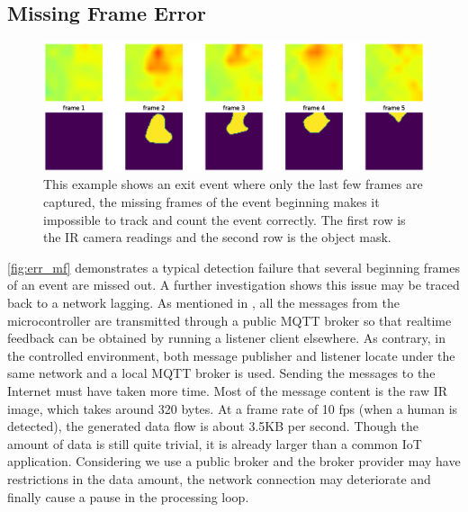 \subsection{Missing Frame Error}
\begin{figure}
  \centering
  \includegraphics[width=\textwidth]{figures/err_missingframe.eps}
  \caption{This example shows an exit event where only the last few frames are captured, the missing frames of the event beginning makes it impossible to track and count the event correctly. The first row is the IR camera readings and the second row is the object mask.}\label{fig:err_mf}
\end{figure}
\autoref{fig:err_mf} demonstrates a typical detection failure that several beginning frames of an event are missed out. A further investigation shows this issue may be traced back to a network lagging. As mentioned in , all the messages from the microcontroller are transmitted through a public MQTT broker so that realtime feedback can be obtained by running a listener client elsewhere. As contrary, in the controlled environment, both message publisher and listener locate under the same network and a local MQTT broker is used. Sending the messages to the Internet must have taken more time. Most of the message content is the raw IR image, which takes around 320 bytes. At a frame rate of 10 fps (when a human is detected), the generated data flow is about 3.5KB per second. Though the amount of data is still quite trivial, it is already larger than a common IoT application. Considering we use a public broker and the broker provider may have restrictions in the data amount, the network connection may deteriorate and finally cause a pause in the processing loop.

